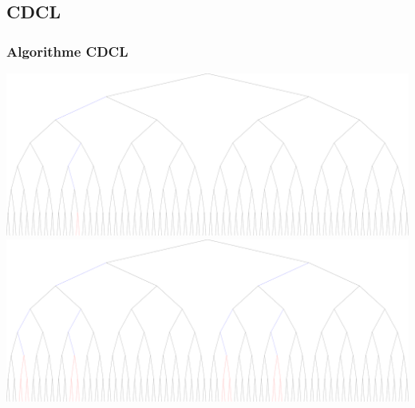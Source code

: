 \documentclass{beamer}
\begin{document}
\subsection{CDCL}
\begin{frame}
    \frametitle{Algorithme CDCL}
    \begin{center}
        \includegraphics[width=0.8\linewidth]{../reso/error.pdf} \\
        \vspace{1em}
        \includegraphics[width=0.8\linewidth]{../reso/eliminated.pdf}
    \end{center}
\end{frame}
\end{document}
